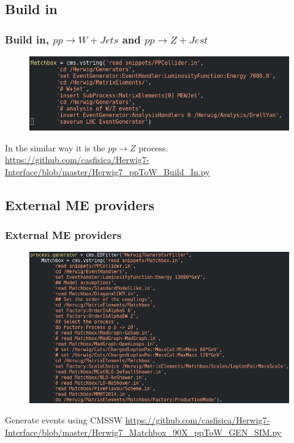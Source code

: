 \documentclass{beamer}
\numberwithin{figure}{section}
\begin{document}
\subsection{Build in}
\begin{frame}
 \frametitle{Build in,  $p p \rightarrow  W+Jets$ and  $p p \rightarrow  Z+Jest$}
 
    \begin{figure}
        \centering
        \includegraphics[width=\textwidth]{pictures/WJetsBuildIn}
    \end{figure}
 
    \begin{exampleblock}{In the similar way it is the $p p \rightarrow  Z$ process.}
        \url{https://github.com/casfisica/Herwig7-Interface/blob/master/Herwig7_ppToW_Build_In.py}
    \end{exampleblock}
 
\end{frame}




\subsection{External ME providers}
\begin{frame}
 \frametitle{External ME providers}
     \begin{figure}
    \centering
    \includegraphics[width=\textwidth]{pictures/ConfigZ0}
    \end{figure}

\begin{exampleblock}{Generate events using CMSSW}
\url{https://github.com/casfisica/Herwig7-Interface/blob/master/Herwig7_Matchbox_90X_ppToW_GEN_SIM.py}
 \end{exampleblock}

\end{frame}
\end{document}
